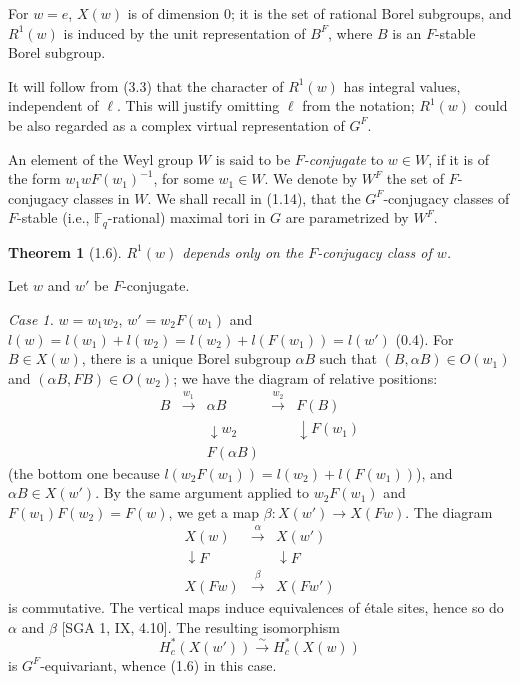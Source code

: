 \documentclass[11pt]{amsart}
\theoremstyle{plain}
\newtheorem{theorem}{Theorem}[section]
\theoremstyle{remark}
\begin{document}
For $w = e$, $X(w)$ is of dimension $0$; it is the set of rational Borel subgroups, and $R^1(w)$ is induced by the unit representation of $B^F$, where $B$ is an $F$-stable Borel subgroup.

It will follow from (3.3) that the character of $R^1(w)$ has integral values, independent of $\ell$. This will justify omitting $\ell$ from the notation; $R^1(w)$ could be also regarded as a complex virtual representation of $G^F$.

An element of the Weyl group $W$ is said to be \textit{$F$-conjugate} to $w \in W$, if it is of the form $w_1 w F(w_1)^{-1}$, for some $w_1 \in W$. We denote by $W^F$ the set of $F$-conjugacy classes in $W$. We shall recall in (1.14), that the $G^F$-conjugacy classes of $F$-stable (i.e., $\mathbb{F}_q$-rational) maximal tori in $G$ are parametrized by $W^F$.

\begin{theorem}[1.6]
$R^1(w)$ depends only on the $F$-conjugacy class of $w$.
\end{theorem}

Let $w$ and $w'$ be $F$-conjugate.

\textit{Case 1.} $w = w_1 w_2$, $w' = w_2 F(w_1)$ and $l(w) = l(w_1) + l(w_2) = l(w_2) + l(F(w_1)) = l(w')$ (0.4). For $B \in X(w)$, there is a unique Borel subgroup $\alpha B$ such that $(B, \alpha B) \in O(w_1)$ and $(\alpha B, FB) \in O(w_2)$; we have the diagram of relative positions:
\[
\begin{array}{ccccc}
B & \xrightarrow{w_1} & \alpha B & \xrightarrow{w_2} & F(B) \\
& & \downarrow{w_2} & & \downarrow{F(w_1)} \\
& & F(\alpha B) & &
\end{array}
\]
(the bottom one because $l(w_2 F(w_1)) = l(w_2) + l(F(w_1))$), and $\alpha B \in X(w')$. By the same argument applied to $w_2 F(w_1)$ and $F(w_1)F(w_2) = F(w)$, we get a map $\beta: X(w') \to X(Fw)$. The diagram
\[
\begin{array}{ccc}
X(w) & \xrightarrow{\alpha} & X(w') \\
\downarrow{F} & & \downarrow{F} \\
X(Fw) & \xrightarrow{\beta} & X(Fw')
\end{array}
\]
is commutative. The vertical maps induce equivalences of \'etale sites, hence so do $\alpha$ and $\beta$ [SGA 1, IX, 4.10]. The resulting isomorphism
\[
H_c^*(X(w')) \xrightarrow{\sim} H_c^*(X(w))
\]
is $G^F$-equivariant, whence (1.6) in this case.
\end{document}
